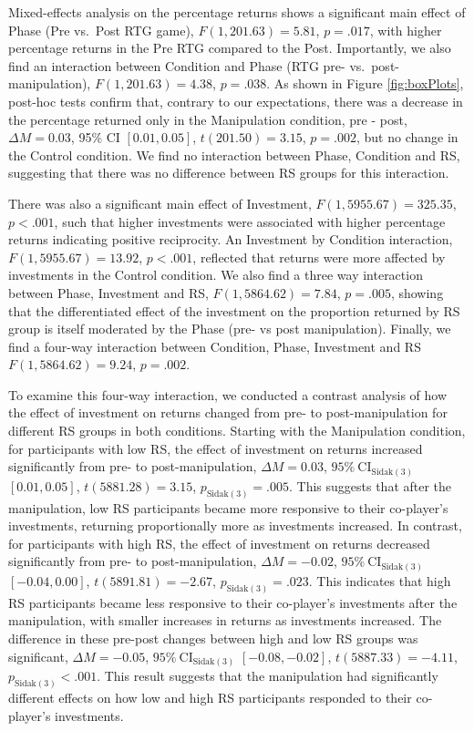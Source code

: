 \documentclass[
]{article}
\begin{document}
Mixed-effects analysis on the percentage returns shows a significant
main effect of Phase (Pre vs.~Post RTG game),
\(F(1, 201.63) = 5.81\), \(p = .017\), with
higher percentage returns in the Pre RTG compared to the Post.
Importantly, we also find an interaction between Condition and Phase
(RTG pre- vs.~post-manipulation),
\(F(1, 201.63) = 4.38\), \(p = .038\).
As shown in Figure \ref{fig:boxPlots}, post-hoc tests confirm that,
contrary to our expectations, there was a decrease in the percentage
returned only in the Manipulation condition, pre - post,
\(\Delta M = 0.03\), 95\% CI \([0.01, 0.05]\), \(t(201.50) = 3.15\), \(p = .002\),
but no change in the Control condition. We find no interaction between
Phase, Condition and RS, suggesting that there was no difference between
RS groups for this interaction.

There was also a significant main effect of Investment,
\(F(1, 5955.67) = 325.35\), \(p < .001\),
such that higher investments were associated with higher percentage
returns indicating positive reciprocity. An Investment by Condition
interaction,
\(F(1, 5955.67) = 13.92\), \(p < .001\),
reflected that returns were more affected by investments in the Control
condition. We also find a three way interaction between Phase,
Investment and RS,
\(F(1, 5864.62) = 7.84\), \(p = .005\),
showing that the differentiated effect of the investment on the
proportion returned by RS group is itself moderated by the Phase (pre-
vs post manipulation). Finally, we find a four-way interaction between
Condition, Phase, Investment and RS
\(F(1, 5864.62) = 9.24\), \(p = .002\).

To examine this four-way interaction, we conducted a contrast analysis
of how the effect of investment on returns changed from pre- to
post-manipulation for different RS groups in both conditions. Starting
with the Manipulation condition, for participants with low RS, the
effect of investment on returns increased significantly from pre- to
post-manipulation,
\(\Delta M = 0.03\), \(95\%\ \mathrm{CI}_\mathrm{\scriptstyle Sidak(3)}\) \([0.01, 0.05]\), \(t(5881.28) = 3.15\), \(p_\mathrm{\scriptstyle Sidak(3)} = .005\).
This suggests that after the manipulation, low RS participants became
more responsive to their co-player's investments, returning
proportionally more as investments increased. In contrast, for
participants with high RS, the effect of investment on returns decreased
significantly from pre- to post-manipulation,
\(\Delta M = -0.02\), \(95\%\ \mathrm{CI}_\mathrm{\scriptstyle Sidak(3)}\) \([-0.04, 0.00]\), \(t(5891.81) = -2.67\), \(p_\mathrm{\scriptstyle Sidak(3)} = .023\).
This indicates that high RS participants became less responsive to their
co-player's investments after the manipulation, with smaller increases
in returns as investments increased. The difference in these pre-post
changes between high and low RS groups was significant,
\(\Delta M = -0.05\), \(95\%\ \mathrm{CI}_\mathrm{\scriptstyle Sidak(3)}\) \([-0.08, -0.02]\), \(t(5887.33) = -4.11\), \(p_\mathrm{\scriptstyle Sidak(3)} < .001\).
This result suggests that the manipulation had significantly different
effects on how low and high RS participants responded to their
co-player's investments.
\end{document}
